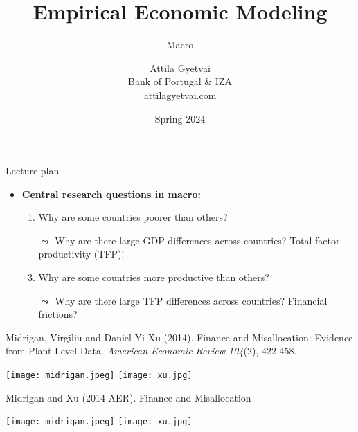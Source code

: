 \documentclass[aspectratio=169,compress,t,xcolor=table]{beamer}
\title[]{Empirical Economic Modeling}
\subtitle{Macro}
\author[]{%
  \texorpdfstring{%
    Attila Gyetvai \\ \vspace*{0.5em} \footnotesize Bank of Portugal \& IZA \\ \href{https://attilagyetvai.com}{\color{MyStructure}\ul{attilagyetvai.com}}
  }{Gyetvai}
}
\date[]{\footnotesize Spring 2024}
\begin{document}
{
\begin{frame}
  \titlepage
\end{frame}
}
\addtocounter{framenumber}{-1}

\begin{frame}{Lecture plan}
  \begin{itemize}
    \vfill\item {\color{MyStructure}\textbf{Central research questions in macro:}}
    \begin{enumerate}
      \addtolength{\baselineskip}{1em}
      \item Why are some countries poorer than others?
      \item[\(\leadsto\)] Why are there large GDP differences across countries? Total factor productivity (TFP)!
      \item Why are some countries more productive than others?
      \item[\(\leadsto\)] Why are there large TFP differences across countries? Financial frictions?
    \end{enumerate}
  \end{itemize}
\end{frame}

\begin{frame}{}
Midrigan, Virgiliu and Daniel Yi Xu (2014). Finance and Misallocation: Evidence from Plant-Level Data. \textit{American Economic Review 104}(2), 422-458.
  \begin{center}
    \texttt{[image: midrigan.jpeg]} \hspace*{1em}
    \texttt{[image: xu.jpg]}
  \end{center}
\end{frame}
\addtocounter{framenumber}{-1}

\begin{frame}{}
Midrigan and Xu (2014 AER). Finance and Misallocation \\ \phantom{,ou}
  \begin{center}
    \texttt{[image: midrigan.jpeg]} \hspace*{1em}
    \texttt{[image: xu.jpg]}
  \end{center}
\end{frame}
\addtocounter{framenumber}{-1}
\end{document}

